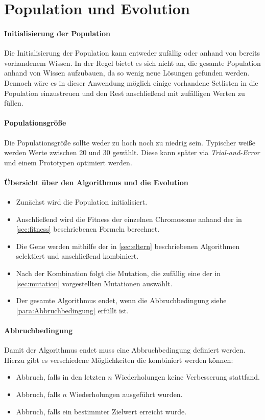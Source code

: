 \section{Population und Evolution}\label{sec:popEv}
\paragraph{Initialisierung der Population}
Die Initialisierung der Population kann entweder zufällig oder anhand von bereits vorhandenem Wissen.
In der Regel bietet es sich nicht an, die gesamte Population anhand von Wissen aufzubauen, da so
wenig neue Lösungen gefunden werden.\\
Dennoch wäre es in dieser Anwendung möglich einige vorhandene Setlisten in die Population einzustreuen und den Rest
anschließend mit zufälligen Werten zu füllen.

\paragraph{Populationsgröße}
Die Populationsgröße sollte weder zu hoch noch zu niedrig sein. Typischer weiße werden Werte zwischen
20 und 30 gewählt. Diese kann später via \textit{Trial-and-Error} und einem Prototypen optimiert werden.

\paragraph{Übersicht über den Algorithmus und die Evolution}

\begin{itemize}
    \item Zunächst wird die Population initialisiert.
    \item Anschließend wird die Fitness der einzelnen Chromosome anhand der in \autoref{sec:fitness} beschriebenen
        Formeln berechnet.
    \item Die Gene werden mithilfe der in \autoref{sec:eltern} beschriebenen Algorithmen selektiert und anschließend
        kombiniert.
    \item Nach der Kombination folgt die Mutation, die zufällig eine der in \autoref{sec:mutation} vorgestellten
    Mutationen auswählt.
    \item Der gesamte Algorithmus endet, wenn die Abbruchbedingung siehe \autoref{para:Abbruchbedingung} erfüllt ist.
\end{itemize}

\paragraph{Abbruchbedingung}\label{para:Abbruchbedingung}
Damit der Algorithmus endet muss eine Abbruchbedingung definiert werden.
Hierzu gibt es verschiedene Möglichkeiten die kombiniert werden können:
\begin{itemize}
    \item Abbruch, falls in den letzten $n$ Wiederholungen keine Verbesserung stattfand.
    \item Abbruch, falls $n$ Wiederholungen ausgeführt wurden.
    \item Abbruch, falls ein bestimmter Zielwert erreicht wurde.
\end{itemize}

